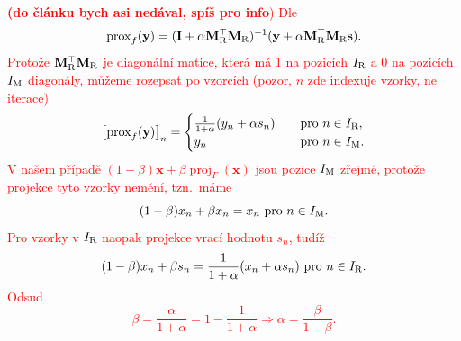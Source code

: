 \documentclass[conference]{IEEEtran}
\newcommand{\todo}[1]{\textcolor{red}{#1}}
\begin{document}
\noindent
\todo{\textbf{(do článku bych asi nedával, spíš pro info})}
\todo{%
	Dle \cite[Tab.\,1]{Combettes2011}
	\begin{equation}
		\operatorname{prox}_f(\mathbf{y}) = (\mathbf{I} + \alpha \mathbf{M}_{\textup{R}}^\top\mathbf{M}_{\textup{R}})^{-1}(\mathbf{y} + \alpha\mathbf{M}_{\textup{R}}^\top\mathbf{M}_{\textup{R}}\mathbf{s}).
	\end{equation}
	Protože $\mathbf{M}_{\textup{R}}^\top\mathbf{M}_{\textup{R}}$ je diagonální matice, která má 1 na pozicích $I_\textup{R}$ a 0 na pozicích $I_\textup{M}$ diagonály, můžeme rozepsat po vzorcích (pozor, $n$ zde indexuje vzorky, ne iterace)
	\begin{equation}
		\left[\operatorname{prox}_f(\mathbf{y})\right]_n = \begin{cases}
			\frac{1}{1+\alpha}(y_n + \alpha s_n) \quad &\text{pro } n\in I_\textup{R}, \\
			y_n\quad &\text{pro } n\in I_\textup{M}. 
		\end{cases}
	\end{equation}
	V našem případě $(1-\beta)\mathbf{x} + \beta \operatorname{proj}_{\Gamma}(\mathbf{x})$ jsou pozice $I_\textup{M}$ zřejmé, protože projekce tyto vzorky nemění, tzn.\ máme
	\begin{equation}
		(1-\beta) x_n + \beta x_n = x_n \text{ pro } n\in I_\textup{M}.
	\end{equation}
	Pro vzorky v $I_\textup{R}$ naopak projekce vrací hodnotu $s_n$, tudíž
	\begin{equation}
		(1-\beta) x_n + \beta s_n = \frac{1}{1+\alpha}(x_n + \alpha s_n)\text{ pro } n\in I_\textup{R}.
	\end{equation}
	Odsud
	\begin{equation}
		\beta = \frac{\alpha}{1+\alpha} = 1 - \frac{1}{1+\alpha} \Longrightarrow \alpha = \frac{\beta}{1-\beta}.
	\end{equation}
}

%



\end{document}
